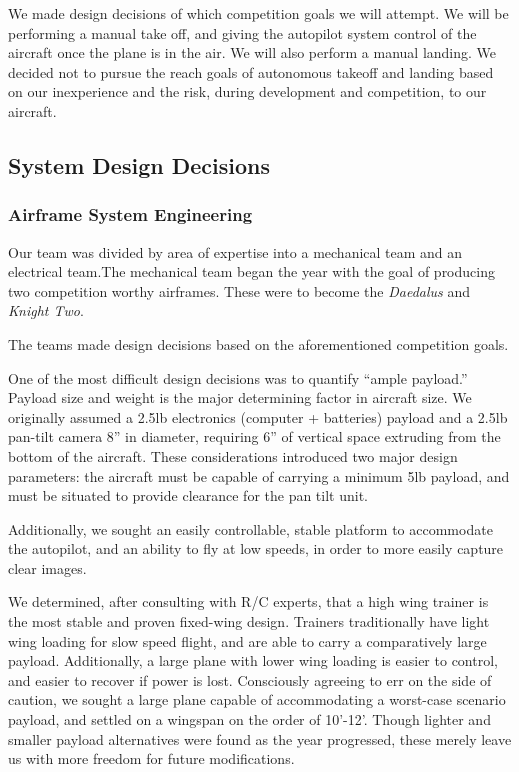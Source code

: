 \documentclass[10pt]{report}
\begin{document}
We made design decisions of which competition goals we will attempt. 
We will be performing a manual take off, and giving the autopilot system control of the aircraft once the plane is in the air. We will also perform a manual landing. We decided not to pursue the reach goals of autonomous takeoff and landing based on our inexperience and the risk, during development and competition, to our aircraft.
\subsection{System Design Decisions}
\subsubsection{Airframe System Engineering}

Our team was divided by area of expertise into a mechanical team and an electrical team.The mechanical team began the year with the goal of producing two competition worthy airframes. These were to become the \emph{Daedalus} and \emph{Knight Two}.

The teams made design decisions based on the aforementioned competition goals.

One of the most difficult design decisions was to quantify ``ample payload.'' Payload size and weight is the major determining factor in aircraft size.  We originally assumed a 2.5lb electronics (computer + batteries) payload and a 2.5lb pan-tilt camera 8'' in diameter, requiring 6'' of vertical space extruding from the bottom of the aircraft. These considerations introduced two major design parameters: the aircraft must be capable of carrying a minimum 5lb payload, and must be situated to provide clearance for the pan tilt unit.

Additionally, we sought an easily controllable, stable platform to accommodate the autopilot, and an ability to fly at low speeds, in order to more easily capture clear images.

We determined, after consulting with R/C experts, that a high wing trainer is the most stable and proven fixed-wing design. Trainers traditionally have light wing loading for slow speed flight, and are able to carry a comparatively large payload. Additionally, a large plane with lower wing loading is easier to control, and easier to recover if power is lost. Consciously agreeing to err on the side of caution, we sought a large plane capable of accommodating a worst-case scenario payload, and settled on a wingspan on the order of 10'-12'. Though lighter and smaller payload alternatives were found as the year progressed, these merely leave us with more freedom for future modifications.
\end{document}
